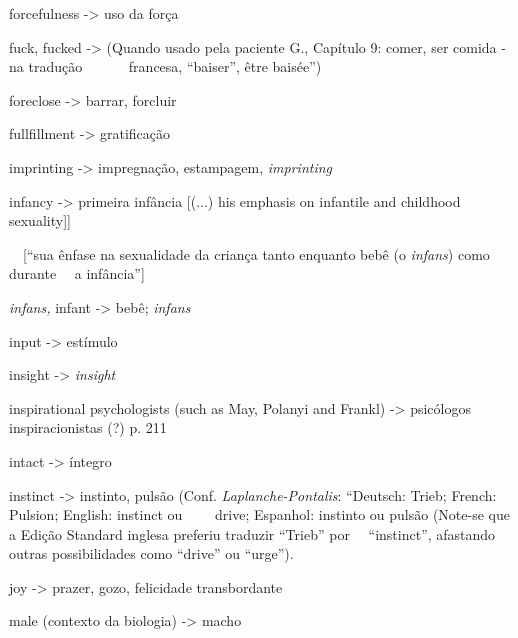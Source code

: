 \smallskip

\noindent forcefulness -> uso da força

\smallskip

\noindent fuck, fucked -> (Quando usado pela paciente G., Capítulo 9:
comer, ser comida - na tradução \ \ \ \ \ \ francesa,
``baiser'', être baisée'')

\smallskip

\noindent foreclose -> barrar, forcluir

\smallskip

\noindent fullfillment -> gratificação

\smallskip

\noindent imprinting -> impregnação, estampagem, \textit{imprinting}

\smallskip

\noindent infancy -> primeira infância [(...) his emphasis on
infantile and childhood sexuality]]

\smallskip

\noindent \ \  [``sua ênfase na sexualidade da criança tanto enquanto
bebê (o \textit{infans}) como durante \ \ a infância'']

\smallskip

\noindent \textit{infans,} infant -> bebê; \textit{infans}

\smallskip

\noindent input -> estímulo

\smallskip

\noindent insight -> \textit{insight}

\smallskip

\noindent inspirational psychologists (such as May, Polanyi and Frankl)
-> psicólogos inspiracionistas (?) p. 211

\smallskip

\noindent intact -> íntegro

\smallskip

\noindent instinct -> instinto, pulsão (Conf.  \textit{Laplanche-Pontalis}: ``Deutsch:
Trieb; French: Pulsion; English: instinct ou \ \ \ \ drive; Espanhol: instinto
ou pulsão (Note-se que a Edição Standard inglesa preferiu traduzir ``Trieb''
por \ \ ``instinct'', afastando outras possibilidades como ``drive'' ou
``urge'').

\smallskip

\noindent joy -> prazer, gozo, felicidade transbordante

\smallskip

\noindent male (contexto da biologia) -> macho


